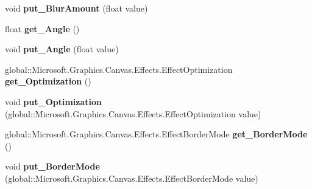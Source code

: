 \begin{DoxyCompactItemize}
void {\bfseries put\+\_\+\+Blur\+Amount} (float value)
\item 
\mbox{\label{class_microsoft_1_1_graphics_1_1_canvas_1_1_effects_1_1_directional_blur_effect_a8bdc7eff811b34db9a82120142b52a62}} 
float {\bfseries get\+\_\+\+Angle} ()
\item 
\mbox{\label{class_microsoft_1_1_graphics_1_1_canvas_1_1_effects_1_1_directional_blur_effect_a271e08d62a710392a1eb0425cf803992}} 
void {\bfseries put\+\_\+\+Angle} (float value)
\item 
\mbox{\label{class_microsoft_1_1_graphics_1_1_canvas_1_1_effects_1_1_directional_blur_effect_a34a41131fdf14b40d3d67a9a36936eb3}} 
global\+::\+Microsoft.\+Graphics.\+Canvas.\+Effects.\+Effect\+Optimization {\bfseries get\+\_\+\+Optimization} ()
\item 
\mbox{\label{class_microsoft_1_1_graphics_1_1_canvas_1_1_effects_1_1_directional_blur_effect_a497e67c7243081593b64fe7d0947243a}} 
void {\bfseries put\+\_\+\+Optimization} (global\+::\+Microsoft.\+Graphics.\+Canvas.\+Effects.\+Effect\+Optimization value)
\item 
\mbox{\label{class_microsoft_1_1_graphics_1_1_canvas_1_1_effects_1_1_directional_blur_effect_a8e1e8704473064ff603694cb02c0c78f}} 
global\+::\+Microsoft.\+Graphics.\+Canvas.\+Effects.\+Effect\+Border\+Mode {\bfseries get\+\_\+\+Border\+Mode} ()
\item 
\mbox{\label{class_microsoft_1_1_graphics_1_1_canvas_1_1_effects_1_1_directional_blur_effect_acdd57b5d08067ae3121bdbefa68e50b8}} 
void {\bfseries put\+\_\+\+Border\+Mode} (global\+::\+Microsoft.\+Graphics.\+Canvas.\+Effects.\+Effect\+Border\+Mode value)
\item 
\mbox{\label{class_microsoft_1_1_graphics_1_1_canvas_1_1_effects_1_1_directional_blur_effect_aef24cab3895c1c8498616466fcb52a51}} 

\end{DoxyCompactItemize}
